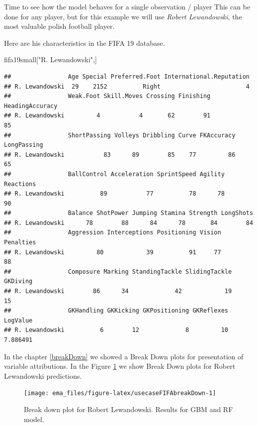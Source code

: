 \documentclass[]{krantz}
\newenvironment{Shaded}{\begin{snugshade}}{\end{snugshade}}
\newcommand{\NormalTok}[1]{#1}
\newcommand{\StringTok}[1]{\textcolor[rgb]{0.31,0.60,0.02}{#1}}
\begin{document}
Time to see how the model behaves for a single observation / player
This can be done for any player, but for this example we will use \emph{Robert Lewandowski}, the most valuable polish football player.

Here are his characteristics in the FIFA 19 database.

\begin{Shaded}
\begin{Highlighting}[]
\NormalTok{fifa19small[}\StringTok{"R. Lewandowski"}\NormalTok{,]}
\end{Highlighting}
\end{Shaded}

\begin{verbatim}
##                Age Special Preferred.Foot International.Reputation
## R. Lewandowski  29    2152          Right                        4
##                Weak.Foot Skill.Moves Crossing Finishing HeadingAccuracy
## R. Lewandowski         4           4       62        91              85
##                ShortPassing Volleys Dribbling Curve FKAccuracy LongPassing
## R. Lewandowski           83      89        85    77         86          65
##                BallControl Acceleration SprintSpeed Agility Reactions
## R. Lewandowski          89           77          78      78        90
##                Balance ShotPower Jumping Stamina Strength LongShots
## R. Lewandowski      78        88      84      78       84        84
##                Aggression Interceptions Positioning Vision Penalties
## R. Lewandowski         80            39          91     77        88
##                Composure Marking StandingTackle SlidingTackle GKDiving
## R. Lewandowski        86      34             42            19       15
##                GKHandling GKKicking GKPositioning GKReflexes LogValue
## R. Lewandowski          6        12             8         10 7.886491
\end{verbatim}

In the chapter \ref{breakDown} we showed a Break Down plots for presentation of variable attributions. In the Figure \ref{fig:usecaseFIFAbreakDown} we show Break Down plots for Robert Lewandowski predictions.

\begin{figure}

{\centering \texttt{[image: ema\_files/figure-latex/usecaseFIFAbreakDown-1]} 

}

\caption{Break down plot for Robert Lewandowski. Results for GBM and RF model.}\label{fig:usecaseFIFAbreakDown}
\end{figure}
\end{document}
